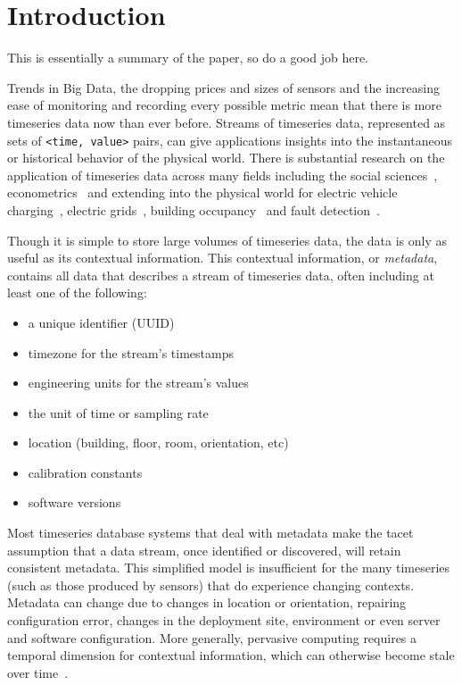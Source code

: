 \section{Introduction}

This is essentially a summary of the paper, so do a good job here.
\fi

Trends in Big Data, the dropping prices and sizes of sensors and the increasing
ease of monitoring and recording every possible metric mean that there is more
timeseries data now than ever before.  Streams of timeseries data, represented
as sets of \texttt{<time, value>} pairs, can give applications insights into
the instantaneous or historical behavior of the physical world.  There is
substantial research on the application of timeseries data across many fields
including the social sciences~\cite{mccleary1980applied},
econometrics~\cite{lutkepohl2004applied} and extending into the physical world
for electric vehicle charging~\cite{sortomme2011optimal}, electric
grids~\cite{carreras2004evidence}, building occupancy~\cite{richardson2008high}
and fault detection~\cite{fontugne2013strip}.

Though it is simple to store large volumes
of timeseries data, the data is only as useful as its contextual information.
This contextual information, or \emph{metadata}, contains all data that describes
a stream of timeseries data, often including at least one of the following:

\begin{itemize}
\item a unique identifier (UUID)
\item timezone for the stream's timestamps
\item engineering units for the stream's values
\item the unit of time or sampling rate
\item location (building, floor, room, orientation, etc)
\item calibration constants
\item software versions
\end{itemize}


Most timeseries database systems that deal with metadata  make the tacet
assumption that a data stream, once identified or discovered, will retain
consistent metadata. This simplified model is insufficient for the many
timeseries (such as those produced by sensors) that do experience changing
contexts.  Metadata can change due to changes in location or orientation,
repairing configuration error, changes in the deployment site, environment or
even server and software configuration. More generally, pervasive computing
requires a temporal dimension for contextual information, which can otherwise
become stale over time~\cite{henricksen2002modeling}.

